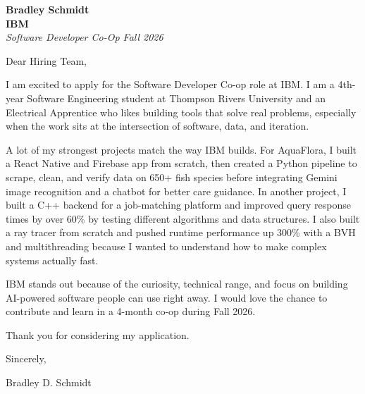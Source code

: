 \documentclass[11pt]{article}
\begin{document}
\textbf{Bradley Schmidt}\\
\vspace{0.5em}
\textbf{IBM}\\
\textit{Software Developer Co-Op Fall 2026}

Dear Hiring Team,

\par

I am excited to apply for the Software Developer Co-op role at IBM. I am a 4th-year Software Engineering student at Thompson Rivers University and an Electrical Apprentice who likes building tools that solve real problems, especially when the work sits at the intersection of software, data, and iteration.

\par

A lot of my strongest projects match the way IBM builds. For AquaFlora, I built a React Native and Firebase app from scratch, then created a Python pipeline to scrape, clean, and verify data on 650+ fish species before integrating Gemini image recognition and a chatbot for better care guidance. In another project, I built a C++ backend for a job-matching platform and improved query response times by over 60\% by testing different algorithms and data structures. I also built a ray tracer from scratch and pushed runtime performance up 300\% with a BVH and multithreading because I wanted to understand how to make complex systems actually fast.

\par

IBM stands out because of the curiosity, technical range, and focus on building AI-powered software people can use right away. I would love the chance to contribute and learn in a 4-month co-op during Fall 2026.

\par

Thank you for considering my application.

\par

Sincerely,

\par

Bradley D. Schmidt
\end{document}
